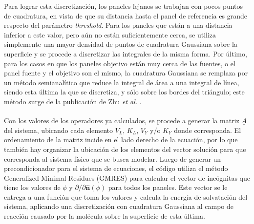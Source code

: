 \documentclass[12pt, oneside, numbers, spanish]{ezthesis}
\numberwithin{equation}{section}
\begin{document}
Para lograr esta discretización, los paneles lejanos se trabajan con pocos puntos de cuadratura, en vista de que su distancia hasta el panel de referencia es grande respecto del parámetro \textit{threshold}. Para los paneles que están a una distancia inferior a este valor, pero aún no están suficientemente cerca, se utiliza simplemente una mayor densidad de puntos de cuadratura Gaussiana sobre la superficie y se procede a discretizar las integrales de la misma forma. Por último, para los casos en que los paneles objetivo están muy cerca de las fuentes, o el panel fuente y el objetivo son el mismo, la cuadratura Gaussiana se remplaza por un método semianalítico que reduce la integral de área a una integral de línea, siendo esta última la que se discretiza, y sólo sobre los bordes del triángulo; este método surge de la publicación de Zhu \textit{et al.} \cite{Zhu}.\\\\
Con los valores de los operadores ya calculados, se procede a generar la matriz $\underline{A}$ del sistema, ubicando cada elemento $V_L$, $K_L$, $V_Y$ y/o $K_Y$ donde corresponda. El ordenamiento de la matriz incide en el lado derecho de la ecuación, por lo que también hay organizar la ubicación de los elementos del vector solución para que corresponda al sistema físico que se busca modelar. Luego de generar un precondicionador para el sistema de ecuaciones, el código utiliza el método Generalized Minimal Residues (GMRES) para calcular el vector de incógnitas que tiene los valores de $\phi$ y $\partial/\partial\hat{\mathbf{n}}(\phi)$ para todos los paneles. Este vector se le entrega a una función que toma los valores y calcula la energía de solvatación del sistema, aplicando una discretización con cuadratura Gaussiana al campo de reacción causado por la molécula sobre la superficie de esta última. 



\end{document}
